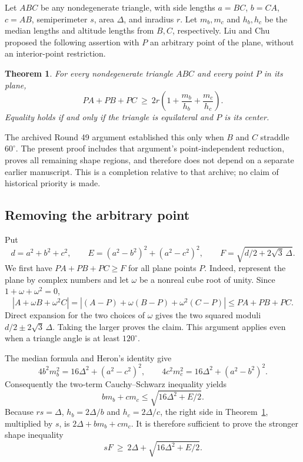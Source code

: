 \documentclass[11pt,a4paper]{article}
\numberwithin{equation}{section}
\newtheorem{theorem}{Theorem}[section]
\theoremstyle{definition}
\theoremstyle{remark}
\begin{document}
Let $ABC$ be any nondegenerate triangle, with side lengths
$a=BC$, $b=CA$, $c=AB$, semiperimeter $s$, area $\Delta$, and
inradius $r$.  Let $m_b,m_c$ and $h_b,h_c$ be the median lengths
and altitude lengths from $B,C$, respectively.
Liu and Chu \cite[p.~92, Conjecture 4, equation (30)]{add49keio:lc}
proposed the following assertion with $P$ an arbitrary point of the
plane, without an interior-point restriction.

\begin{theorem}\label{add49keio:full}
For every nondegenerate triangle $ABC$ and every point $P$ in its plane,
\[
 PA+PB+PC\ \ge\ 2r\left(1+\frac{m_b}{h_b}+\frac{m_c}{h_c}\right).
\]
Equality holds if and only if the triangle is equilateral and $P$ is its
center.
\end{theorem}

The archived Round 49 argument established this only when $B$ and $C$
straddle $60^\circ$.  The present proof includes that argument's
point-independent reduction, proves all remaining shape regions, and
therefore does not depend on a separate earlier manuscript. This is a
completion relative to that archive; no claim of historical priority is made.

\subsection{Removing the arbitrary point}\label{add49keio:point}

Put
\[
 d=a^2+b^2+c^2,\qquad
 E=(a^2-b^2)^2+(a^2-c^2)^2,\qquad
 F=\sqrt{d/2+2\sqrt3\,\Delta}.
\]
We first have $PA+PB+PC\ge F$ for all plane points $P$.
Indeed, represent the plane by complex numbers and let $\omega$ be a
nonreal cube root of unity. Since $1+\omega+\omega^2=0$,
\[
 |A+\omega B+\omega^2C|
 =|(A-P)+\omega(B-P)+\omega^2(C-P)|
 \le PA+PB+PC.
\]
Direct expansion for the two choices of $\omega$ gives the two squared
moduli $d/2\pm2\sqrt3\,\Delta$.  Taking the larger proves the claim.
This argument applies even when a triangle angle is at least $120^\circ$.

The median formula and Heron's identity give
\[
 4b^2m_b^2=16\Delta^2+(a^2-c^2)^2,\qquad
 4c^2m_c^2=16\Delta^2+(a^2-b^2)^2.
\]
Consequently the two-term Cauchy--Schwarz inequality yields
\[
 bm_b+cm_c\le \sqrt{16\Delta^2+E/2}.
\]
Because $rs=\Delta$, $h_b=2\Delta/b$ and $h_c=2\Delta/c$,
the right side in Theorem~\ref{add49keio:full}, multiplied by $s$, is
$2\Delta+bm_b+cm_c$.  It is therefore sufficient to prove the
stronger shape inequality
\begin{equation}\label{add49keio:shape}
 sF\ \ge\ 2\Delta+\sqrt{16\Delta^2+E/2}.
\end{equation}
\end{document}
